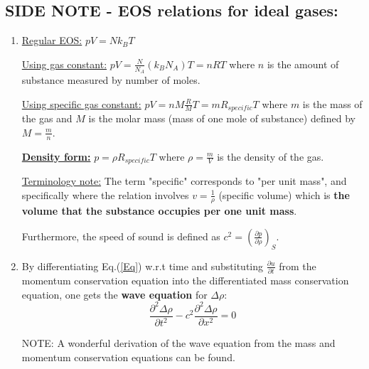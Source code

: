 ﻿\documentclass[11pt]{article}
\begin{document}
\subsection{SIDE NOTE - EOS relations for ideal gases: }
\begin{enumerate}
  \item \underline{Regular EOS:} $p V = N k_B T$
  
  \underline{Using gas constant:} $p V = \frac{N}{N_A} (k_B N_A) T = n R T$ where $n$ is the amount of substance measured by number of moles.
  
  \underline{Using specific gas constant:} $ p V = n M \frac{R}{M} T = m R_{specific} T$ where $m$ is the mass of the gas and $M$ is the molar mass (mass of one mole of substance) defined by $M = \frac{m}{n}$.
  
  \underline{\textbf{Density form:}} $p = \rho R_{specific} T$ where $\rho = \frac{m}{V}$ is the density of the gas.
  
  \underline{Terminology note:} The term "specific" corresponds to "per unit mass", and specifically where the relation involves $v=\frac{1}{\rho}$ (specific volume) which is \textbf{the volume that the substance occupies per one unit mass}.

  Furthermore, the speed of sound is defined as $c^2 = (\frac{\partial p}{\partial \rho})_S$.

  \item By differentiating Eq.(\ref{Eq}) w.r.t time and substituting $\frac{\partial u}{\partial t}$ from the momentum conservation equation into the differentiated mass conservation equation, one gets the \textbf{wave equation} for $\Delta \rho$:
  \begin{equation}
    \frac{\partial^2 \Delta \rho}{\partial t^2} - c^2 \frac{\partial^2 \Delta \rho}{\partial x^2} = 0
  \end{equation}
  
  NOTE: A wonderful derivation of the wave equation from the mass and momentum conservation equations can be found.
  

\end{enumerate}
\end{document}

